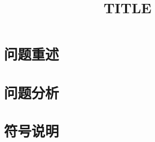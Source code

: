 \documentclass{cumcmthesis}
\title{TITLE}
\begin{document}
	\maketitle
	\begin{abstract}


	\end{abstract}

	\section{问题重述}


	\section{问题分析}

	
	\section{符号说明}
\end{document}
